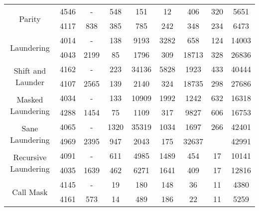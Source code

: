 \begin{table}[]
{\begin{tabular}{c|c|c|c|cc|cc|c}
\multirow{2}{*}{Parity}                 & 4546           & -           & 548         & 151         & 12   & 406           & 320      & 5651           \\
                                        & 4117           & 838         & 385         & 785         & 242  & 348           & 234      & 6473           \\\hline
\multirow{2}{*}{Laundering}             & 4014           & -           & 138         & 9193        & 3282 & 658           & 124      & 14003          \\
                                        & 4043           & 2199        & 85          & 1796        & 309  & 18713         & 328      & 26836          \\\hline
\multirow{2}{*}{Shift and Launder}      & 4162           & -           & 223         & 34136       & 5828 & 1923          & 433      & 40444          \\
                                        & 4107           & 2565        & 139         & 2140        & 324  & 18735         & 298      & 27686          \\\hline
\multirow{2}{*}{Masked Laundering}      & 4034           & -           & 133         & 10909       & 1992 & 1242          & 632      & 16318          \\
                                        & 4288           & 1454        & 75          & 1109        & 317  & 9827          & 606      & 16753          \\\hline
\multirow{2}{*}{Sane Laundering}        & 4065           & -           & 1320        & 35319       & 1034 & 1697          & 266      & 42401          \\
                                        & 4969           & 2395        & 947         & 2043        & 175  & 32637         &          & 42991          \\\hline\hline
\multirow{2}{*}{Recursive Laundering}   & 4091           & -           & 611         & 4985        & 1489 & 454           & 17       & 10141          \\
                                        & 4035           & 1639        & 462         & 6271        & 1641 & 409           & 17       & 12816          \\\hline
\multirow{2}{*}{Call Mask}              & 4145           & -           & 19          & 180         & 148  & 36            & 11       & 4380           \\
                                        & 4161           & 573         & 14          & 489         & 186  & 22            & 11       & 5259           \\\hline

\end{tabular}}
\end{table}
